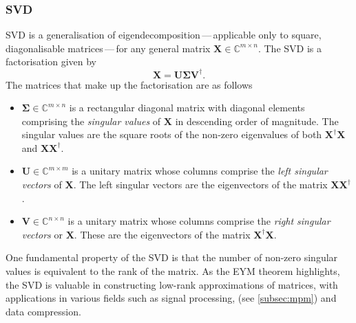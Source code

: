 \subsubsection{\Acf{SVD}}
\ac{SVD} is a generalisation of eigendecomposition\,---\,applicable only to
square, diagonalisable matrices\,---\,for any general matrix $\symbf{X} \in
\mathbb{C}^{m \times n}$. The \ac{SVD} is a factorisation given by
\begin{equation}
    \symbf{X} = \symbf{U} \symbf{\Sigma} \symbf{V}^{\dagger}.
\end{equation}
The matrices that make up the factorisation are as follows
\begin{itemize}
    \item $\symbf{\Sigma} \in \mathbb{C}^{m \times n}$ is a rectangular
        diagonal matrix with diagonal elements comprising the \emph{singular
        values} of $\symbf{X}$ in descending order of magnitude. The singular
        values are the square roots of the non-zero eigenvalues of both
        $\symbf{X}^{\dagger}\symbf{X}$ and $\symbf{X}\symbf{X}^{\dagger}$.
    \item $\symbf{U} \in \mathbb{C}^{m \times m}$ is a unitary matrix whose columns
        comprise the \emph{left singular vectors} of $\symbf{X}$. The left
        singular vectors are the eigenvectors of the matrix
        $\symbf{X}\symbf{X}^{\dagger}$.
    \item $\symbf{V} \in \mathbb{C}^{n \times n}$ is a unitary matrix whose columns
        comprise the \emph{right singular vectors} or $\symbf{X}$. These
        are the eigenvectors of the matrix $\symbf{X}^{\dagger}\symbf{X}$.
\end{itemize}
One fundamental property of the \ac{SVD} is that the number of non-zero
singular values is equivalent to the rank of the matrix. As the \ac{EYM}
theorem highlights, the \ac{SVD} is valuable in constructing low-rank
approximations of matrices, with applications in various fields such as signal
processing, (see \cref{subsec:mpm}) and data compression\cite{Jaradat2021}.

